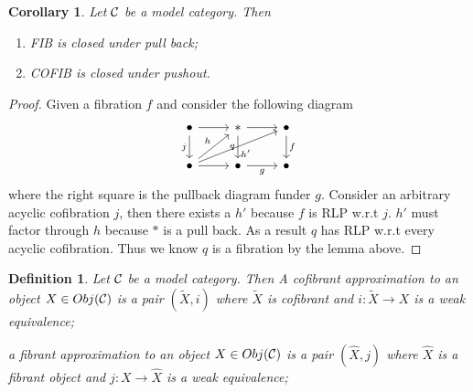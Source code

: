 \documentclass[11pt]{article}
\newtheorem{cor}[thm]{Corollary}
\newtheorem{dfn}[thm]{Definition}
\newcommand{\calc}{{\cal C}}
\newcommand{\lrta}{\longrightarrow}
\begin{document}
\begin{cor}
Let $\calc$ be a model category. Then 
\begin{enumerate}[label=(\roman*)]
\item FIB is closed under pull back;
\item COFIB is closed under pushout.
\end{enumerate}
\end{cor}
\begin{proof}
Given a fibration $f$ and consider the following diagram
$$
\begin{tikzcd}
\bullet \arrow[d, "j"'] \arrow[r] & * \arrow[r] \arrow[d, "q"'] & \bullet \arrow[d, "f"] \\
\bullet \arrow[r] \arrow[rru, "h'"'] \arrow[ru, "h"] & \bullet \arrow[r, "g"'] & \bullet
\end{tikzcd}
$$
where the right square is the pullback diagram funder $g$. Consider an arbitrary acyclic cofibration $j$, then there exists a $h'$ because $f$ is RLP w.r.t $j$. $h'$ must factor through $h$ because $*$ is a pull back. As a result $q$ has RLP w.r.t every acyclic cofibration. Thus we know $q$ is a fibration by the lemma above.
\end{proof}

\begin{dfn}
Let $\calc$ be a model category. Then A cofibrant approximation to an object $X\in Obj(\calc)$ is a pair $(\tilde{X},i)$ where $\tilde{X}$ is cofibrant and $i:\tilde{X}\lrta X$ is a weak equivalence;

a fibrant approximation to an object $X\in Obj(\calc)$ is a pair $(\hat{X},j)$ where $\hat{X}$ is a fibrant object and $j: X\lrta \hat{X}$ is a weak equivalence;
\end{dfn}
\end{document}
